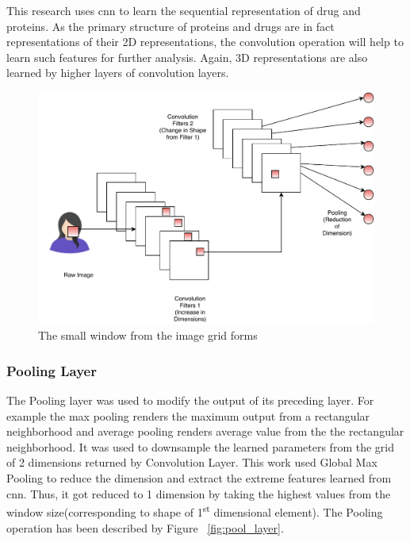   This research uses \acrfull{cnn} to learn the sequential representation of drug and proteins. As the primary structure of proteins and drugs are in fact representations of their 2D representations, the convolution operation will help to learn such features for further analysis. Again, 3D representations are also learned by higher layers of convolution layers. \citep{Adhikari2017}

  \begin{figure}
    \centering
    \includegraphics[width=.5\linewidth]{mainmatter/3-Methodology/images/System-Block-CNN-Layer.pdf}
    \caption[Working of CNN Block]{The small window from the image grid forms }
    \label{fig:cnn}
  \end{figure}
  
  \subsubsection{Pooling Layer}
  
  The Pooling layer was used to modify the output of its preceding layer. For example the max pooling renders the maximum output from a rectangular neighborhood and average pooling renders average value from the the rectangular neighborhood. It was used to downsample the learned parameters from the grid of 2 dimensions returned by Convolution Layer. This work used Global Max Pooling to reduce the dimension and extract the extreme features learned from \acrshort{cnn}. Thus, it got reduced to 1 dimension by taking the highest values from the window size(corresponding to shape of 1\textsuperscript{st} dimensional element). The Pooling operation has been described by Figure ~\ref{fig:pool_layer}.

